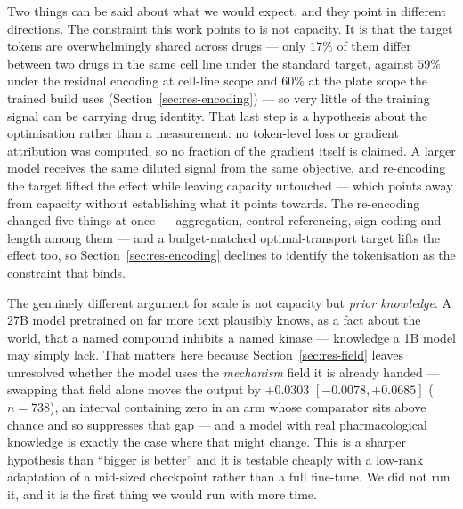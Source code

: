 Two things can be said about what we would expect, and they point in different directions. The
constraint this work points to is not capacity. It is that the target tokens are overwhelmingly
shared across drugs --- only $17\%$ of them differ between two drugs in the same cell line under the
standard target, against $59\%$ under the residual encoding at cell-line scope and $60\%$ at the
plate scope the trained build uses (Section~\ref{sec:res-encoding}) --- so
very little of the training signal can be carrying drug identity. That last step is a hypothesis
about the optimisation rather than a measurement: no token-level loss or gradient attribution was
computed, so no fraction of the gradient itself is claimed. A larger model receives the same diluted
signal from the same objective, and re-encoding the target lifted the effect while leaving capacity
untouched --- which points away from capacity without establishing what it points towards. The
re-encoding changed five things at once --- aggregation, control referencing, sign coding and length
among them --- and a budget-matched optimal-transport target lifts the effect too, so
Section~\ref{sec:res-encoding}
declines to identify the tokenisation as the constraint that binds.

The genuinely different argument for scale is not capacity but \emph{prior knowledge}. A 27B model
pretrained on far more text plausibly knows, as a fact about the world, that a named compound
inhibits a named kinase --- knowledge a 1B model may simply lack. That matters here because
Section~\ref{sec:res-field} leaves unresolved whether the model uses the \emph{mechanism} field it
is already handed --- swapping that field alone moves the output by $+0.0303$
\nolinebreak[3]$[-0.0078, +0.0685]$ ($n=738$), an interval containing zero in an arm whose
comparator sits above chance and so suppresses that gap --- and a model with real pharmacological
knowledge is exactly the case
where that might change. This is a sharper hypothesis than ``bigger is better'' and
it is testable cheaply with a low-rank adaptation of a mid-sized checkpoint rather than a full
fine-tune. We did not run it, and it is the first thing we would run with more time.

